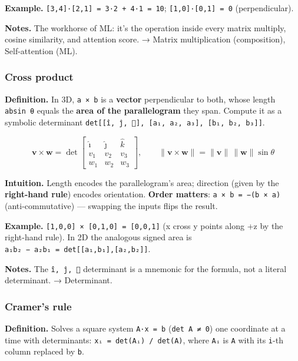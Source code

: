 \documentclass[
  10pt,
  letterpaper,
  onecolumn]{article}
\begin{document}
\textbf{Example.} \texttt{{[}3,4{]}·{[}2,1{]}\ =\ 3·2\ +\ 4·1\ =\ 10};
\texttt{{[}1,0{]}·{[}0,1{]}\ =\ 0} (perpendicular).

\textbf{Notes.} The workhorse of ML: it's the operation inside every
matrix multiply, cosine similarity, and attention score. → Matrix
multiplication (composition), Self-attention (ML).

\hypertarget{cross-product}{%
\subsubsection{Cross product}\label{cross-product}}

\textbf{Definition.} In 3D, \texttt{a\ ×\ b} is a \textbf{vector}
perpendicular to both, whose length
\texttt{\textbar{}a\textbar{}\textbar{}b\textbar{}sin\ θ} equals the
\textbf{area of the parallelogram} they span. Compute it as a symbolic
determinant
\texttt{det{[}{[}î,\ ĵ,\ {]},\ {[}a₁,\ a₂,\ a₃{]},\ {[}b₁,\ b₂,\ b₃{]}{]}}.

\begin{equation*}
\mathbf{v}\times\mathbf{w}=
\det\begin{bmatrix}\hat{\imath}&\hat{\jmath}&\hat{k}\\v_1&v_2&v_3\\w_1&w_2&w_3\end{bmatrix},
\qquad
\|\mathbf{v}\times\mathbf{w}\|=\|\mathbf{v}\|\,\|\mathbf{w}\|\sin\theta
\end{equation*}

\textbf{Intuition.} Length encodes the parallelogram's area; direction
(given by the \textbf{right-hand rule}) encodes orientation.
\textbf{Order matters}: \texttt{a\ ×\ b\ =\ −(b\ ×\ a)}
(anti-commutative) --- swapping the inputs flips the result.

\textbf{Example.} \texttt{{[}1,0,0{]}\ ×\ {[}0,1,0{]}\ =\ {[}0,0,1{]}}
(x cross y points along +z by the right-hand rule). In 2D the analogous
signed area is
\texttt{a₁b₂\ −\ a₂b₁\ =\ det{[}{[}a₁,b₁{]},{[}a₂,b₂{]}{]}}.

\textbf{Notes.} The \texttt{î,\ ĵ,\ } determinant is a mnemonic for the
formula, not a literal determinant. → Determinant.

\hypertarget{cramers-rule}{%
\subsubsection{Cramer's rule}\label{cramers-rule}}

\textbf{Definition.} Solves a square system \texttt{A·x\ =\ b}
(\texttt{det\ A\ ≠\ 0}) one coordinate at a time with determinants:
\texttt{xᵢ\ =\ det(Aᵢ)\ /\ det(A)}, where \texttt{Aᵢ} is \texttt{A} with
its \texttt{i}-th column replaced by \texttt{b}.
\end{document}
